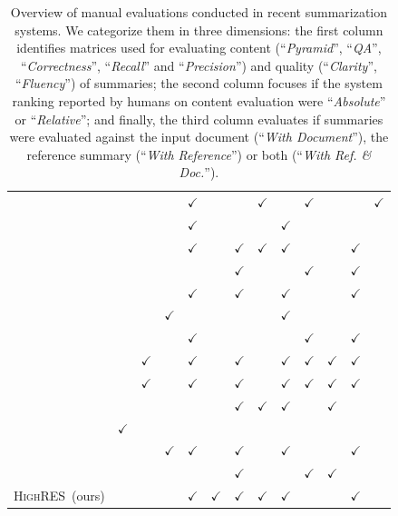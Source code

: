 \documentclass[11pt,a4paper]{article}
\newcommand\highres{\textsc{HighRES}}
\begin{document}
\begin{table}[th!]
\begin{tabular}{r | c c c c c c c | c c | c c r}
\citet{Guo2018a}        &   &  &   &  $\checkmark$  & &  &  $\checkmark$    &    &  $\checkmark$     &     &    &  $\checkmark$  \\
\citet{hardy2018sum}      &   &  &   & $\checkmark$  & &   &     & $\checkmark$  &      &     &    &   \\
\citet{Hsu2018}         &  &  &    &  $\checkmark$  & &  $\checkmark$ &  $\checkmark$    &  $\checkmark$   &      &     &  $\checkmark$   &  \\
\citet{Krishna2018a}       &   &  &   &  &  &  $\checkmark$ &     &    &  $\checkmark$     &     &  $\checkmark$   &    \\
\citet{Kryscinski2018}     &   &  &   &  $\checkmark$ & &  $\checkmark$ & &  $\checkmark$   &      &  & $\checkmark$ &   \\
\citet{Li2018b}         &   &   & $\checkmark$ &  &  &   &     &  $\checkmark$   &      &     &     &    \\
\citet{narayan-sidenet18}      & &   &    &  $\checkmark$ & &  &     &    & $\checkmark$ &  &  $\checkmark$   &    \\
\citet{narayan18xsum}          &   &  $\checkmark$ &    &  $\checkmark$ &  &  $\checkmark$ &     &  $\checkmark$  &  $\checkmark$     &   $\checkmark$  &  $\checkmark$   &   \\
\citet{Narayan2018}       &   & $\checkmark$ &   &  $\checkmark$  & &  $\checkmark$ &     &  $\checkmark$  &  $\checkmark$   &  $\checkmark$   &  $\checkmark$  &   \\
\citet{Peyrard2018a}     &   &  &   &  &  &  $\checkmark$ &  $\checkmark$    &  $\checkmark$   &      &  $\checkmark$    &    &   \\
\citet{ShafieiBavani2018}      &  $\checkmark$ &  &    &  &  &  &     &    &      &     &    &  \\
\citet{Song2018a}       &   &  & $\checkmark$   &  $\checkmark$ &  &  $\checkmark$ &     &  $\checkmark$   &      &     &  $\checkmark$   & \\
\citet{Yang2018a}       &  &  &    &  &  &  $\checkmark$ &     &    &  $\checkmark$     &  $\checkmark$    &    & \\
\highres\ (ours)    &   &  &   & $\checkmark$ & $\checkmark$ & $\checkmark$  &  $\checkmark$   & $\checkmark$  &      &     &  $\checkmark$  &   \\
\hline
\end{tabular}
\caption{Overview of manual evaluations conducted in recent summarization systems. We categorize them in three dimensions: the first column identifies matrices used for evaluating content (``\textit{Pyramid}'', ``\textit{QA}'', ``\textit{Correctness}'', ``\textit{Recall}'' and ``\textit{Precision}'') and quality (``\textit{Clarity}'', ``\textit{Fluency}'') of summaries; the second column focuses if the system ranking reported by humans on content evaluation were ``\textit{Absolute}'' or ``\textit{Relative}''; and finally, the third column evaluates if summaries were evaluated against the input document (``\textit{With Document}''), the reference summary (``\textit{With Reference}'') or both (``\textit{With Ref. \& Doc.}'').}
\label{tab:litreview}
\end{table}
\end{document}
